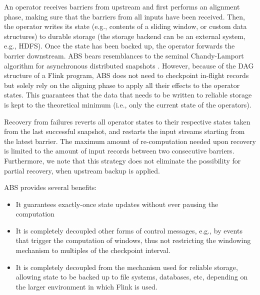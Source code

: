 An operator receives barriers from upstream and first performs an alignment phase, making sure that the barriers from all inputs have been received. Then, the operator writes its state (e.g., contents of a sliding window, or custom data structures) to durable storage (the storage backend can be an external system, e.g., HDFS). Once the state has been backed up, the operator forwards the barrier downstream. ABS bears resemblances to the seminal Chandy-Lamport algorithm for asynchronous distributed snapshots \cite{chandy1985distributed}. However, because of the DAG structure of a Flink program, ABS does not need to checkpoint in-flight records but solely rely on the aligning phase to apply all their effects to the operator states. This guarantees that the data that needs to be written to reliable storage is kept to the theoretical minimum (i.e., only the current state of the operators).

Recovery from failures reverts all operator states to their respective states taken from the last successful snapshot, and restarts the input streams starting from the latest barrier. The maximum amount of re-computation needed upon recovery is limited to the amount of input records between two consecutive barriers. Furthermore,  we note that this strategy does not eliminate the possibility for partial recovery, when upstream backup is applied.

\vspace{1mm}
\noindent ABS provides several benefits:\vspace{-3mm}
\begin{itemize}
\item It guarantees exactly-once state updates without ever pausing the computation \vspace{-3mm}
\item It is completely decoupled other forms of control messages, e.g., by events that trigger the computation of windows, thus not restricting the windowing mechanism to multiples of the checkpoint interval. \vspace{-3mm}
\item It is completely decoupled from the mechanism used for reliable storage, allowing state to be backed up to file systems, databases, etc, depending on the larger environment in which Flink is used.
\end{itemize}

